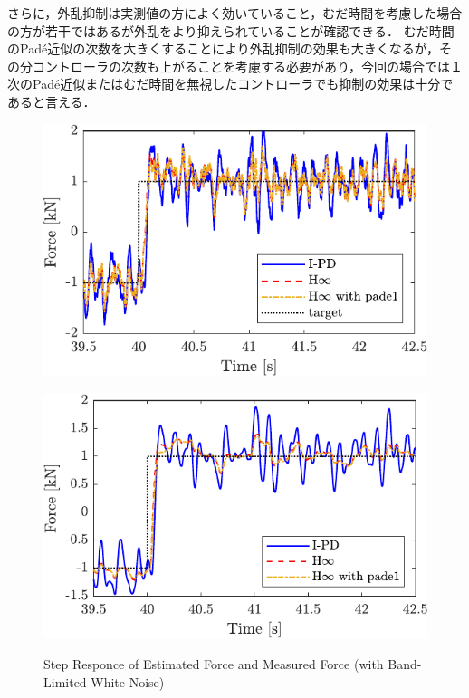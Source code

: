 さらに，外乱抑制は実測値の方によく効いていること，むだ時間を考慮した場合の方が若干ではあるが外乱をより抑えられていることが確認できる．
むだ時間のPad\'e近似の次数を大きくすることにより外乱抑制の効果も大きくなるが，その分コントローラの次数も上がることを考慮する必要があり，今回の場合では１次のPad\'e近似またはむだ時間を無視したコントローラでも抑制の効果は十分であると言える．
\begin{figure}[t]
    \begin{minipage}{\minipageratio\hsize}
    \centering
        \includegraphics[keepaspectratio, width = \minifigwidth]{contents/ForceControl/figure/1115/crop-1115_diffnoise_estforce_step.pdf}
        \label{fig4:crop-1115_diffnoise_estforce_step}
    \end{minipage} 
    \begin{minipage}{\minipageratio\hsize}
    \centering
        \includegraphics[keepaspectratio, width = \minifigwidth]{contents/ForceControl/figure/1115/crop-1115_diffnoise_force_step.pdf}
        \label{fig4:crop-1115_diffnoise_force_step}
    \end{minipage}
    \caption{Step Responce of Estimated Force and Measured Force (with Band-Limited White Noise)}
    \label{fig4:crop-1115_diffnoise_step}
\end{figure}


